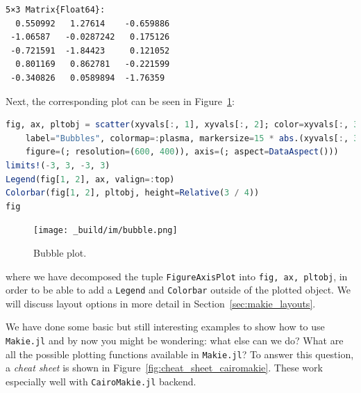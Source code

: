 \documentclass[
  notoc %
]{tufte-book}
\newcommand{\passthrough}[1]{#1}
\begin{document}
\begin{lstlisting}[language=Output]
5×3 Matrix{Float64}:
  0.550992   1.27614    -0.659886
 -1.06587   -0.0287242   0.175126
 -0.721591  -1.84423     0.121052
  0.801169   0.862781   -0.221599
 -0.340826   0.0589894  -1.76359
\end{lstlisting}

Next, the corresponding plot can be seen in Figure~\ref{fig:bubble}:

\begin{lstlisting}[language=Julia]
fig, ax, pltobj = scatter(xyvals[:, 1], xyvals[:, 2]; color=xyvals[:, 3],
    label="Bubbles", colormap=:plasma, markersize=15 * abs.(xyvals[:, 3]),
    figure=(; resolution=(600, 400)), axis=(; aspect=DataAspect()))
limits!(-3, 3, -3, 3)
Legend(fig[1, 2], ax, valign=:top)
Colorbar(fig[1, 2], pltobj, height=Relative(3 / 4))
fig
\end{lstlisting}

\begin{figure}
\hypertarget{fig:bubble}{%
\centering
\texttt{[image: \_build/im/bubble.png]}
\caption{Bubble plot.}\label{fig:bubble}
}
\end{figure}

where we have decomposed the tuple
\passthrough{\lstinline!FigureAxisPlot!} into
\passthrough{\lstinline!fig, ax, pltobj!}, in order to be able to add a
\passthrough{\lstinline!Legend!} and \passthrough{\lstinline!Colorbar!}
outside of the plotted object. We will discuss layout options in more
detail in Section~\ref{sec:makie_layouts}.

We have done some basic but still interesting examples to show how to
use \passthrough{\lstinline!Makie.jl!} and by now you might be
wondering: what else can we do? What are all the possible plotting
functions available in \passthrough{\lstinline!Makie.jl!}? To answer
this question, a \emph{cheat sheet} is shown in
Figure~\ref{fig:cheat_sheet_cairomakie}. These work especially well with
\passthrough{\lstinline!CairoMakie.jl!} backend.
\end{document}
